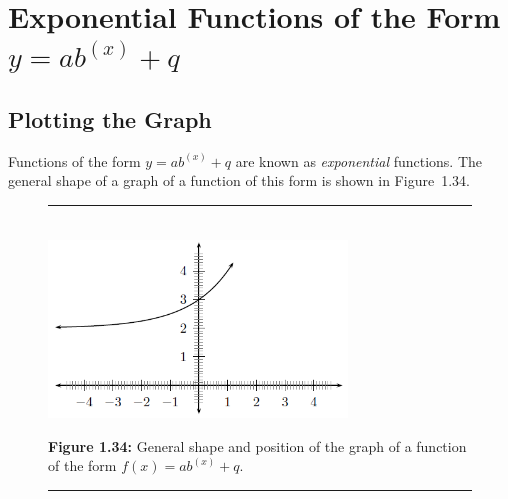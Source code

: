             \section{ Exponential Functions of the Form $y=a{b}^{\left(x\right)}+q$}
            \nopagebreak
   \subsection{Plotting the Graph}         
        \label{m39348*id249604}Functions of the form $y=a{b}^{\left(x\right)}+q$ are known as \textsl{exponential} functions. The general shape of a graph of a function of this form is shown in Figure~1.34.\par 
    \setcounter{subfigure}{0}
	\begin{figure}[H] %
    \begin{center}
    \rule[.1in]{\figurerulewidth}{.005in} \\
        \label{m39348*uid173!!!underscore!!!media}\label{m39348*uid173!!!underscore!!!printimage}\includegraphics[width=300px]{col11306.imgs/m39348_MG10C11_027.png} %
      \vspace{2pt}
    \vspace{\rubberspace}\par \begin{cnxcaption}
	  \small \textbf{Figure 1.34: }General shape and position of the graph of a function of the form $f\left(x\right)=a{b}^{\left(x\right)}+q$.
	\end{cnxcaption}
    \vspace{.1in}
    \rule[.1in]{\figurerulewidth}{.005in} \\
    \end{center}
 \end{figure}       
\label{m39348*secfhsst!!!underscore!!!id3489}
